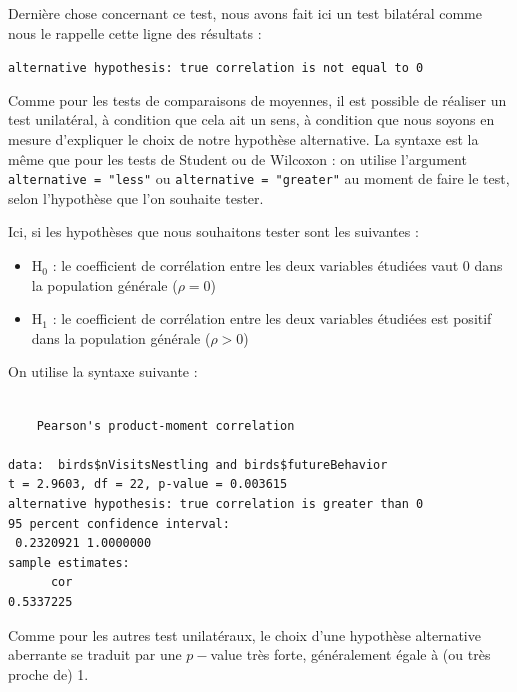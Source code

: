 \documentclass[
  a4paper,
]{article}
\newenvironment{Shaded}{\begin{snugshade}}{\end{snugshade}}
\newcommand{\DataTypeTok}[1]{\textcolor[rgb]{0.00,0.34,0.68}{#1}}
\newcommand{\KeywordTok}[1]{\textcolor[rgb]{0.12,0.11,0.11}{\textbf{#1}}}
\newcommand{\NormalTok}[1]{\textcolor[rgb]{0.12,0.11,0.11}{#1}}
\newcommand{\OperatorTok}[1]{\textcolor[rgb]{0.12,0.11,0.11}{#1}}
\newcommand{\StringTok}[1]{\textcolor[rgb]{0.75,0.01,0.01}{#1}}
\providecommand{\tightlist}{%
  \setlength{\itemsep}{0pt}\setlength{\parskip}{0pt}}
\begin{document}
Dernière chose concernant ce test, nous avons fait ici un test bilatéral comme nous le rappelle cette ligne des résultats :

\texttt{alternative\ hypothesis:\ true\ correlation\ is\ not\ equal\ to\ 0}

Comme pour les tests de comparaisons de moyennes, il est possible de réaliser un test unilatéral, à condition que cela ait un sens, à condition que nous soyons en mesure d'expliquer le choix de notre hypothèse alternative. La syntaxe est la même que pour les tests de Student ou de Wilcoxon : on utilise l'argument \texttt{alternative\ =\ "less"} ou \texttt{alternative\ =\ "greater"} au moment de faire le test, selon l'hypothèse que l'on souhaite tester.

Ici, si les hypothèses que nous souhaitons tester sont les suivantes :

\begin{itemize}
\tightlist
\item
  H\(_0\) : le coefficient de corrélation entre les deux variables étudiées vaut 0 dans la population générale (\(\rho = 0\))
\item
  H\(_1\) : le coefficient de corrélation entre les deux variables étudiées est positif dans la population générale (\(\rho > 0\))
\end{itemize}

On utilise la syntaxe suivante :

\begin{Shaded}
\end{Shaded}

\begin{verbatim}

    Pearson's product-moment correlation

data:  birds$nVisitsNestling and birds$futureBehavior
t = 2.9603, df = 22, p-value = 0.003615
alternative hypothesis: true correlation is greater than 0
95 percent confidence interval:
 0.2320921 1.0000000
sample estimates:
      cor 
0.5337225 
\end{verbatim}

Comme pour les autres test unilatéraux, le choix d'une hypothèse alternative aberrante se traduit par une \(p-\)value très forte, généralement égale à (ou très proche de) 1.
\end{document}
